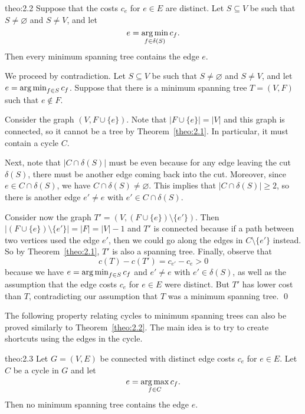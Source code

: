 \begin{theo}{theo:2.2}
    Suppose that the costs $c_e$ for $e \in E$ are distinct. 
    Let $S \subseteq V$ be such that $S \neq \varnothing$ and $S \neq V$, 
    and let 
    \[ e = \operatorname*{arg\,min}_{f \in \delta(S)} c_f. \] 
    Then every minimum spanning tree contains the edge $e$. 
\end{theo}
\begin{pf}
    We proceed by contradiction. Let $S \subseteq V$ be such that $S 
    \neq \varnothing$ and $S \neq V$, and let $e = \operatorname*{arg\,min}_{f\in S} c_f$. 
    Suppose that there is a minimum spanning tree $T = (V, F)$ such that 
    $e \notin F$. 

    Consider the graph $(V, F \cup \{e\})$. Note that $|F \cup \{e\}| = |V|$ 
    and this graph is connected, so it cannot be a tree by Theorem~\ref{theo:2.1}. 
    In particular, it must contain a cycle $C$. 

    Next, note that $|C \cap \delta(S)|$ must be even because for any 
    edge leaving the cut $\delta(S)$, there must be another edge coming back 
    into the cut. Moreover, since $e \in C \cap \delta(S)$, we have 
    $C \cap \delta(S) \neq \varnothing$. This implies that 
    $|C \cap \delta(S)| \geq 2$, so there is another edge $e' \neq e$ 
    with $e' \in C \cap \delta(S)$.

    Consider now the graph $T' = (V, (F \cup \{e\}) \setminus \{e'\})$. 
    Then $|(F \cup \{e\}) \setminus \{e'\}| = |F| = |V| - 1$ and $T'$ is 
    connected because if a path between two vertices used the edge $e'$, 
    then we could go along the edges in $C \setminus \{e'\}$ instead. 
    So by Theorem~\ref{theo:2.1}, $T'$ is also a spanning tree. 
    Finally, observe that 
    \[ c(T) - c(T') = c_{e'} - c_e > 0 \] 
    because we have $e = \operatorname*{arg\,min}_{f\in S} c_f$ and $e' \neq e$ with 
    $e' \in \delta(S)$, as well as the assumption that the edge 
    costs $c_e$ for $e \in E$ were distinct. But $T'$ has lower cost 
    than $T$, contradicting our assumption that $T$ was a minimum 
    spanning tree. \qed
\end{pf}\vspace{-0.25cm}

The following property relating cycles to minimum spanning trees 
can also be proved similarly to Theorem~\ref{theo:2.2}. 
The main idea is to try to create shortcuts using the edges in the cycle. 

\begin{theo}{theo:2.3}
    Let $G = (V, E)$ be connected with distinct edge costs 
    $c_e$ for $e \in E$. Let $C$ be a cycle in $G$ and let 
    \[ e = \operatorname*{arg\,max}_{f\in C} c_f. \] 
    Then no minimum spanning tree contains the edge $e$. 
\end{theo}

